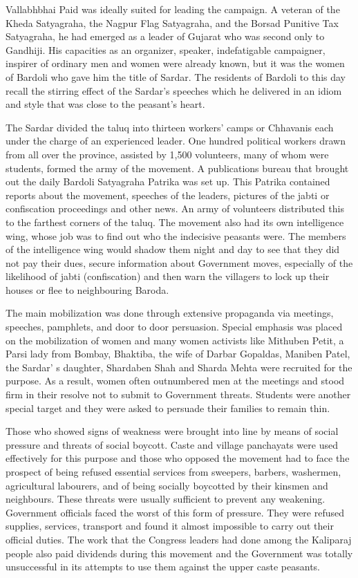 Vallabhbhai Paid was ideally suited for leading the campaign. A veteran of the Kheda Satyagraha, the Nagpur Flag Satyagraha, and the Borsad Punitive Tax Satyagraha, he had emerged as a leader of Gujarat who was second only to Gandhiji. His capacities as an organizer, speaker, indefatigable campaigner, inspirer of ordinary men and women were already known, but it was the women of Bardoli who gave him the title of Sardar. The residents of Bardoli to this day recall the stirring effect of the Sardar's speeches which he delivered in an idiom and style that was close to the peasant's heart.

The Sardar divided the taluq into thirteen workers' camps or Chhavanis each under the charge of an experienced leader. One hundred political workers drawn from all over the province, assisted by 1,500 volunteers, many of whom were students, formed the army of the movement. A publications bureau that brought out the daily Bardoli Satyagraha Patrika was set up. This Patrika contained reports about the movement, speeches of the leaders, pictures of the jabti or confiscation proceedings and other news. An army of volunteers distributed this to the farthest corners of the taluq. The movement also had its own intelligence wing, whose job was to find out who the indecisive peasants were. The members of the intelligence wing would shadow them night and day to see that they did not pay their dues, secure information about Government moves, especially of the likelihood of jabti (confiscation) and then warn the villagers to lock up their houses or flee to neighbouring Baroda.

The main mobilization was done through extensive propaganda via meetings, speeches, pamphlets, and door to door persuasion. Special emphasis was placed on the mobilization of women and many women activists like Mithuben Petit, a Parsi lady from Bombay, Bhaktiba, the wife of Darbar Gopaldas, Maniben Patel, the Sardar' s daughter, Shardaben Shah and Sharda Mehta were recruited for the purpose. As a result, women often outnumbered men at the meetings and stood firm in their resolve not to submit to Government threats. Students were another special target and they were asked to persuade their families to remain thin.

Those who showed signs of weakness were brought into line by means of social pressure and threats of social boycott. Caste and village panchayats were used effectively for this purpose and those who opposed the movement had to face the prospect of being refused essential services from sweepers, barbers, washermen, agricultural labourers, and of being socially boycotted by their kinsmen and neighbours. These threats were usually sufficient to prevent any weakening. Government officials faced the worst of this form of pressure. They were refused supplies, services, transport and found it almost impossible to carry out their official duties. The work that the Congress leaders had done among the Kaliparaj people also paid dividends during this movement and the Government was totally unsuccessful in its attempts to use them against the upper caste peasants.

